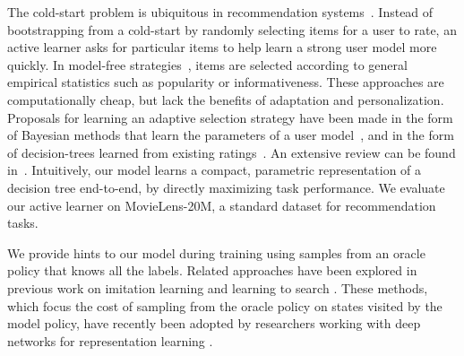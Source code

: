 The cold-start problem is ubiquitous in recommendation systems~\citep{aggarwal2016recommender,rs1,harpale2008personalized,sun2013cold,elahi2016survey}. Instead of bootstrapping from a cold-start by randomly selecting items for a user to rate, an active learner asks for particular items to help learn a strong user model more quickly. In model-free strategies~\cite{rashid2008learning}, items are selected according to general empirical statistics such as popularity or informativeness. These approaches are computationally cheap, but lack the benefits of adaptation and personalization.
Proposals for learning an adaptive selection strategy have been made in the form of Bayesian methods that learn the parameters of a user model~\cite{houlsby2014cold,harpale2008personalized}, and in the form of decision-trees learned from existing ratings~\cite{sun2013cold}.
An extensive review can be found in~\citet{elahi2016survey}.
Intuitively, our model learns a compact, parametric representation of a decision tree end-to-end, by directly maximizing task performance. We evaluate our active learner on MovieLens-20M, a standard dataset for recommendation tasks.

We provide hints to our model during training using samples from an oracle policy that knows all the labels. Related approaches have been explored in previous work on imitation learning and learning to search \cite{ross2014, chang2015}. These methods, which focus the cost of sampling from the oracle policy on states visited by the model policy, have recently been adopted by researchers working with deep networks for representation learning \cite{zhang2017, sun2017}.
